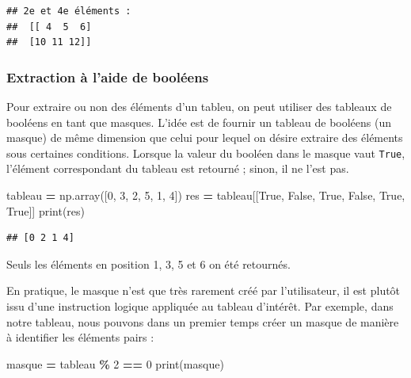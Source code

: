 \documentclass[
  12pt,
]{book}
\newenvironment{Shaded}{\begin{snugshade}}{\end{snugshade}}
\newcommand{\BuiltInTok}[1]{#1}
\newcommand{\DecValTok}[1]{\textcolor[rgb]{0.00,0.00,0.81}{#1}}
\newcommand{\NormalTok}[1]{#1}
\newcommand{\OperatorTok}[1]{\textcolor[rgb]{0.81,0.36,0.00}{\textbf{#1}}}
\newcommand{\VariableTok}[1]{\textcolor[rgb]{0.00,0.00,0.00}{#1}}
\numberwithin{equation}{section}
\numberwithin{countremarque}{section}
\begin{document}
\begin{lstlisting}
## 2e et 4e éléments : 
##  [[ 4  5  6]
##  [10 11 12]]
\end{lstlisting}

\subsubsection{Extraction à l'aide de booléens}\label{extraction-uxe0-laide-de-booluxe9ens}

Pour extraire ou non des éléments d'un tableu, on peut utiliser des tableaux de booléens en tant que masques. L'idée est de fournir un tableau de booléens (un masque) de même dimension que celui pour lequel on désire extraire des éléments sous certaines conditions. Lorsque la valeur du booléen dans le masque vaut \texttt{True}, l'élément correspondant du tableau est retourné ; sinon, il ne l'est pas.

\begin{Shaded}
\begin{Highlighting}[]
\NormalTok{tableau }\OperatorTok{=}\NormalTok{ np.array([}\DecValTok{0}\NormalTok{, }\DecValTok{3}\NormalTok{, }\DecValTok{2}\NormalTok{, }\DecValTok{5}\NormalTok{, }\DecValTok{1}\NormalTok{, }\DecValTok{4}\NormalTok{])}
\NormalTok{res }\OperatorTok{=}\NormalTok{ tableau[[}\VariableTok{True}\NormalTok{, }\VariableTok{False}\NormalTok{, }\VariableTok{True}\NormalTok{, }\VariableTok{False}\NormalTok{, }\VariableTok{True}\NormalTok{, }\VariableTok{True}\NormalTok{]]}
\BuiltInTok{print}\NormalTok{(res)}
\end{Highlighting}
\end{Shaded}

\begin{lstlisting}
## [0 2 1 4]
\end{lstlisting}

Seuls les éléments en position 1, 3, 5 et 6 on été retournés.

En pratique, le masque n'est que très rarement créé par l'utilisateur, il est plutôt issu d'une instruction logique appliquée au tableau d'intérêt. Par exemple, dans notre tableau, nous pouvons dans un premier temps créer un masque de manière à identifier les éléments pairs :

\begin{Shaded}
\begin{Highlighting}[]
\NormalTok{masque }\OperatorTok{=}\NormalTok{ tableau }\OperatorTok{\%} \DecValTok{2} \OperatorTok{==} \DecValTok{0}
\BuiltInTok{print}\NormalTok{(masque)}
\end{Highlighting}
\end{Shaded}
\end{document}
